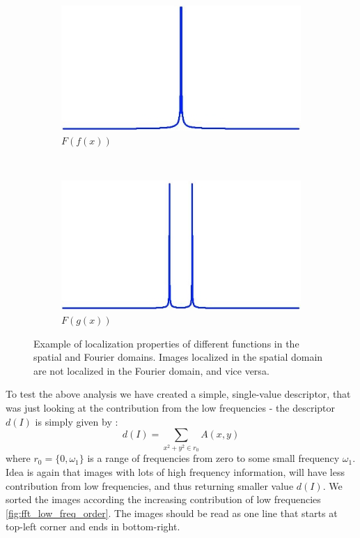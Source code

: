 \documentclass{report}
\begin{document}
\begin{figure}[h]
        \begin{subfigure}[b]{0.2\textwidth}
                \includegraphics[width=\textwidth]{graphics/graph_fft_3.jpg}
                \caption{$F(f(x))$}
                \label{fig:mouse}
        \end{subfigure}
        ~
        \begin{subfigure}[b]{0.2\textwidth}
                \includegraphics[width=\textwidth]{graphics/graph_fft_4.jpg}
                \caption{$F(g(x))$}
                \label{fig:mouse}
        \end{subfigure}
        \caption{Example of localization properties of different functions in the spatial and Fourier domains. Images localized in the spatial domain are not localized in the Fourier domain, and vice versa.}\label{fig:fft_localization}
\end{figure}

To test the above analysis we have created a simple, single-value descriptor, that was just looking at the contribution from the low frequencies - the descriptor $d(I)$ is simply given by :
$$
d(I) = \sum_{x^2 + y^2\in{r_0}}A(x,y)
$$
where $r_0 = \{0, \omega_1\}$ is a range of frequencies from zero to some small frequency $\omega_1$. Idea is again that images with lots of high frequency information, will have less contribution from low frequencies, and thus returning smaller value $d(I)$. We sorted the images according the increasing contribution of low frequencies \ref{fig:fft_low_freq_order}. The images should be read as one line that starts at top-left corner and ends in bottom-right. 
\end{document}
